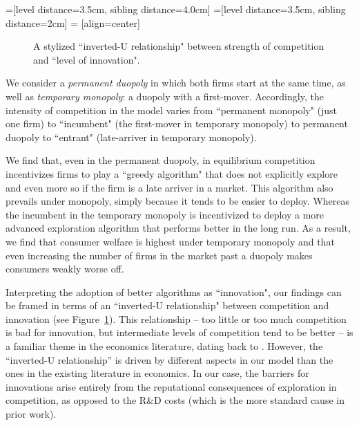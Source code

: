 \documentclass[../competing_bandits_with_appendix.tex]{subfiles}
\begin{document}
=[level distance=3.5cm, sibling distance=4.0cm]
=[level distance=3.5cm, sibling distance=2cm]
 = [align=center]

\begin{figure}
\begin{center}
 \caption{A stylized ``inverted-U relationship" between strength of competition and ``level of innovation".}
\label{fig:inverted-U}
\end{center}
\end{figure}


We consider a \emph{permanent duopoly} in which both firms start at the same time, as well as \emph{temporary monopoly}: a duopoly with a first-mover. Accordingly, the intensity of competition in the model varies from ``permanent monopoly" (just one firm) to ``incumbent" (the first-mover in temporary monopoly) to permanent duopoly to ``entrant" (late-arriver in temporary monopoly). 


We find that, even in the permanent duopoly, in equilibrium competition incentivizes firms to play a ``greedy algorithm" that does not explicitly explore and even more so if the firm is a late arriver in a market. This algorithm also prevails under monopoly, simply because it tends to be easier to deploy. Whereas the incumbent in the temporary monopoly is incentivized to deploy a more advanced exploration algorithm that performs better in the long run. As a result, we find that consumer welfare is highest under temporary monopoly and that even increasing the number of firms in the market past a duopoly makes consumers weakly worse off.

Interpreting the adoption of better algorithms as ``innovation", our findings can be framed in terms of an ``inverted-U relationship" between competition and innovation (see Figure~\ref{fig:inverted-U}). This relationship -- too little or too much competition is bad for innovation, but intermediate levels of competition tend to be better -- is a familiar theme in the economics literature, dating back to \cite{Schumpeter-42}. However, the ``inverted-U relationship'' is driven by different aspects in our model than the ones in the existing literature in economics. In our case, the barriers for innovations arise entirely from the reputational consequences of exploration in competition, as opposed to the R\&D costs (which is the more standard cause in prior work).
\end{document}
